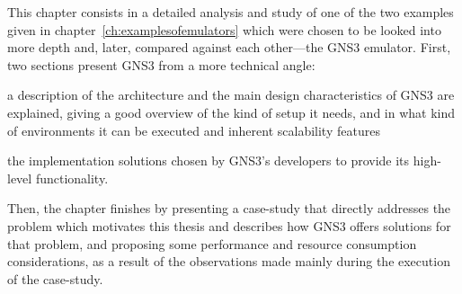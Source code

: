 

This chapter consists in a detailed analysis and study of one of the two examples given in chapter~\ref{ch:examplesofemulators} which were chosen to be looked into more depth and, later, compared against each other---the GNS3 emulator.
First, two sections present GNS3 from a more technical angle:
  \begin{enumerate*}[label=(\roman*), itemjoin={{, }}, itemjoin*={{, and }}]
  \item a description of the architecture and the main design characteristics of GNS3 are explained, giving a good overview of the kind of setup it needs, and in what kind of environments it can be executed and inherent scalability features
  \item the implementation solutions chosen by GNS3's developers to provide its high-level functionality.
  \end{enumerate*}
Then, the chapter finishes by presenting a case-study that directly addresses the problem which motivates this thesis and describes how GNS3 offers solutions for that problem, and proposing some performance and resource consumption considerations, as a result of the observations made mainly during the execution of the case-study.







